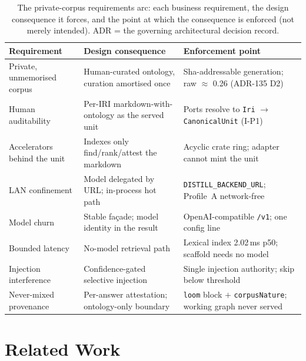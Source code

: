 \documentclass[10pt,twocolumn]{article}
\begin{document}
\begin{table}[t]\centering\small
\caption{The private-corpus requirements arc: each business requirement, the design consequence it
forces, and the point at which the consequence is enforced (not merely intended). ADR = the
governing architectural decision record.}
\label{tab:req}
\renewcommand{\arraystretch}{1.15}
\begin{tabularx}{\textwidth}{@{}>{\raggedright\arraybackslash}p{3.4cm} >{\raggedright\arraybackslash}X >{\raggedright\arraybackslash}p{4.3cm}@{}}
\toprule
Requirement & Design consequence & Enforcement point \\
\midrule
Private, unmemorised corpus & Human-curated ontology, curation amortised once & Sha-addressable generation; raw $\approx$ 0.26 (ADR-135 D2) \\
Human auditability & Per-IRI markdown-with-ontology as the served unit & Ports resolve to \texttt{Iri} $\to$ \texttt{CanonicalUnit} (I-P1) \\
Accelerators behind the unit & Indexes only find/rank/attest the markdown & Acyclic crate ring; adapter cannot mint the unit \\
LAN confinement & Model delegated by URL; in-process hot path & \texttt{DISTILL\_BACKEND\_URL}; Profile~A network-free \\
Model churn & Stable façade; model identity in the result & OpenAI-compatible \texttt{/v1}; one config line \\
Bounded latency & No-model retrieval path & Lexical index 2.02\,ms p50; scaffold needs no model \\
Injection interference & Confidence-gated selective injection & Single injection authority; skip below threshold \\
Never-mixed provenance & Per-answer attestation; ontology-only boundary & \texttt{loom} block $+$ \texttt{corpusNature}; working graph never served \\
\bottomrule
\end{tabularx}
\end{table}

\section{Related Work}\label{sec:related}
\end{document}
